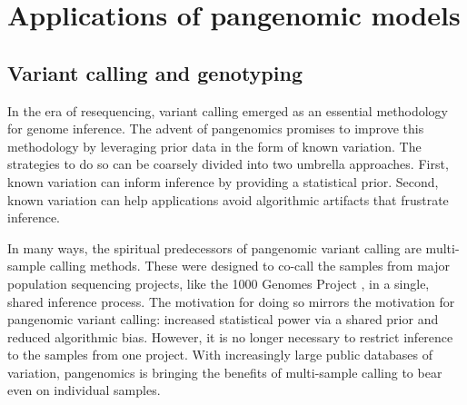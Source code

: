 \section{Applications of pangenomic models}

%

\subsection{Variant calling and genotyping}


In the era of resequencing, variant calling emerged as an essential methodology for genome inference.
The advent of pangenomics promises to improve this methodology by leveraging prior data in the form of known variation.
The strategies to do so can be coarsely divided into two umbrella approaches.
First, known variation can inform inference by providing a statistical prior.
Second, known variation can help applications avoid algorithmic artifacts that frustrate inference.

In many ways, the spiritual predecessors of pangenomic variant calling are multi-sample calling methods. 
These were designed to co-call the samples from major population sequencing projects, like the 1000 Genomes Project \cite{1000_2015}, in a single, shared inference process.
The motivation for doing so mirrors the motivation for pangenomic variant calling: increased statistical power via a shared prior and reduced algorithmic bias.
However, it is no longer necessary to restrict inference to the samples from one project.
With increasingly large public databases of variation, pangenomics is bringing the benefits of multi-sample calling to bear even on individual samples.


